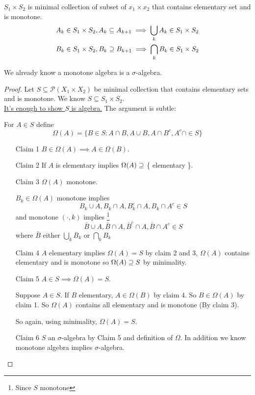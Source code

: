 \begin{lemma}
	$S_1 \times S_2$ is minimal collection of subset of $x_1 \times x_2$ that contains elementary set and is monotone.
	\begin{align*}
		&A_k \in S_1 \times S_2, A_k \subseteq A_{k+1} \implies \bigcup_{k}A_{k} \in S_1 \times S_2 \\
		&B_k \in S_1 \times S_2, B_k \supseteq B_{k+1} \implies \bigcap_{k}B_{k} \in S_1 \times S_2
	\end{align*}
\end{lemma}

\begin{remark}
	We already know a monotone algebra is a $\sigma$-algebra.
\end{remark}

\begin{proof}
	Let $S \subseteq \mathcal{P}(X_1 \times X_2)$ be minimal collection that contains elementary sets and is monotone.
	We know $S \subseteq S_1 \times S_2.$ \\
	\underline{It's enough to show $S$ is algebra.} The argument is subtle:

	\noindent For $A \in S$ define
	\[
		\Omega (A) = \{ B \in S : A \cap B, A \cup B, A \cap B^c, A^c \cap \in S\}
	\]
	\begin{enumerate}
		\item[Claim 1] $B \in \Omega (A) \implies A \in \Omega (B)$.
		\item[Claim 2]  If $A$ is elementary implies $\Omega (A) \supseteq$ \big\{ elementary \big\}.
		\item[Claim 3] $\Omega (A)$ monotone.

			$B_{k} \in \Omega (A) $ monotone implies
			\[
				B_{k} \cup A, B_k \cap A, B_{k}^c \cap A, B_k \cap A^c \in S
			\] and monotone $(\cdot, k)$ implies
			\footnote{Since $S$ monotone}
			\[
				\bar{B} \cup A, \bar{B} \cap A, \bar{B}^c \cap A, \bar{B} \cap A^c \in S
			\] where $\bar{B}$ either $\bigcup_{k} B_k$ or $\bigcap_{k} B_k$

		\item[Claim 4] $A$ elementary implies $\Omega(A) = S$ by claim 2 and 3, $\Omega (A)$ contains elementary and is monotone so $\Omega (A) \supseteq S$ by minimality.
		\item[Claim 5] $A \in S \implies \Omega (A) = S$.

			Suppose $A \in S$. If $B$ elementary, $A \in \Omega (B)$ by claim 4. So $B \in \Omega (A)$ by claim 1. So $\Omega (A)$ contains all elementary and is monotone (By claim 3).

			So again, using minimality, $\Omega (A) = S$.
		\item[Claim 6] $S$ an $\sigma$-algebra by Claim 5 and definition of $\Omega$. In addition we know monotone algebra implies $\sigma$-algebra.
 	\end{enumerate}
\end{proof}

